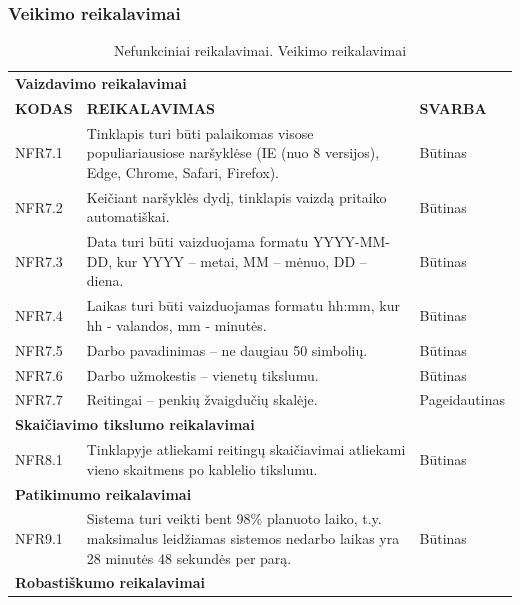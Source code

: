 \documentclass{VUMIFPSkursinis}
\begin{document}
\subsubsection{Veikimo reikalavimai}
\begin{table}[H]
\caption{Nefunkciniai reikalavimai. Veikimo reikalavimai}
\centering
\normalsize
\begin{tabular}{|p{2cm}|p{10cm}|p{3cm}|}
\hline
\rowcolor{gray!30}
\multicolumn{3}{|l|}{\centering{\textbf{Veikimo reikalavimai}}} \\ \hline
\multicolumn{3}{|l|}{\textbf{Vaizdavimo reikalavimai}} \\ \hline
\textbf{KODAS}& \multicolumn{1}{m{10cm}|}{\textbf{REIKALAVIMAS}} & \textbf{SVARBA} \\ \hline
NFR7.1 & \multicolumn{1}{m{10cm}|}{Tinklapis turi būti palaikomas visose populiariausiose naršyklėse (IE (nuo 8 versijos), Edge, Chrome, Safari, Firefox).} & Būtinas \\ \hline
NFR7.2 & \multicolumn{1}{m{10cm}|}{Keičiant naršyklės dydį, tinklapis vaizdą pritaiko automatiškai.} & Būtinas \\ \hline
NFR7.3 & \multicolumn{1}{m{10cm}|}{Data turi būti vaizduojama formatu YYYY-MM-DD, kur YYYY – metai, MM – mėnuo, DD – diena.} & Būtinas \\ \hline
NFR7.4 & \multicolumn{1}{m{10cm}|}{Laikas turi būti vaizduojamas formatu hh:mm, kur hh - valandos, mm - minutės.} & Būtinas \\ \hline
NFR7.5 & \multicolumn{1}{m{10cm}|}{Darbo pavadinimas – ne daugiau 50 simbolių.} & Būtinas \\ \hline
NFR7.6 & \multicolumn{1}{m{10cm}|}{Darbo užmokestis – vienetų tikslumu.} & Būtinas \\ \hline
NFR7.7 & \multicolumn{1}{m{10cm}|}{Reitingai – penkių žvaigdučių skalėje.} & Pageidautinas \\ \hline
\multicolumn{3}{|l|}{\textbf{Skaičiavimo tikslumo reikalavimai}} \\ \hline
NFR8.1 & \multicolumn{1}{m{10cm}|}{Tinklapyje atliekami reitingų skaičiavimai atliekami vieno skaitmens po kablelio tikslumu.} & Būtinas \\ \hline
\multicolumn{3}{|l|}{\textbf{Patikimumo reikalavimai}} \\ \hline
NFR9.1 & \multicolumn{1}{m{10cm}|}{Sistema turi veikti bent 98\% planuoto laiko, t.y. maksimalus leidžiamas sistemos nedarbo laikas yra 28 minutės 48 sekundės per parą.} & Būtinas \\ \hline
\multicolumn{3}{|l|}{\textbf{Robastiškumo reikalavimai}} \\ \hline

\end{tabular}
\end{table}
\end{document}
